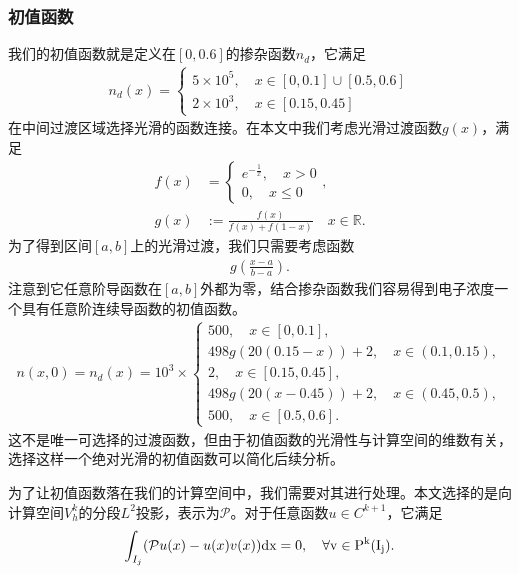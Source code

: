 \subsubsection{初值函数}
我们的初值函数就是定义在$[0, 0.6]$的掺杂函数$n_d$，它满足
\begin{align*}
    n_d(x) = \begin{cases}
                 5\times 10^{5}, \quad x \in [0, 0.1] \cup [0.5, 0.6] \\
                 2\times 10^{3}, \quad x \in [0.15,0.45]
             \end{cases}
\end{align*}
在中间过渡区域选择光滑的函数连接。在本文中我们考虑光滑过渡函数$g(x)$，满足
\begin{align*}
    f(x)               & ={\begin{cases}
                               e^{-{\frac {1}{x}}}, \quad x>0 \\
                               0, \quad x\leq 0\end{cases}} ,                     \\
    \displaystyle g(x) & :={\frac {f(x)}{f(x)+f(1-x)}}\quad x\in \mathbb {R}.
\end{align*}
为了得到区间$[a,b]$上的光滑过渡，我们只需要考虑函数
\begin{align*}
    g(\frac{x-a}{b-a}).
\end{align*}
注意到它任意阶导函数在$[a,b]$外都为零，结合掺杂函数我们容易得到电子浓度一个具有任意阶连续导函数的初值函数。
\begin{align}
    n(x,0) = n_d(x) = 10^3 \times
    \begin{cases}
        500,\quad x\in [0,0.1],                        \\
        498g(20(0.15-x)) + 2,\quad x \in (0.1, 0.15),  \\
        2, \quad x\in [0.15, 0.45],                    \\
        498g(20(x-0.45)) + 2, \quad x \in (0.45, 0.5), \\
        500, \quad x\in [0.5, 0.6].
    \end{cases}
\end{align}
这不是唯一可选择的过渡函数，但由于初值函数的光滑性与计算空间的维数有关，选择这样一个绝对光滑的初值函数可以简化后续分析。

为了让初值函数落在我们的计算空间中，我们需要对其进行处理。本文选择的是向计算空间$V_h^k$的分段$L^2$投影，表示为$\mathcal{P}$。对于任意函数$u\in C^{k+1}$，它满足
\begin{align}
    \int_{I_j}(\mathcal{P}u(x)-u(x)v(x)) \rm{d}x = 0, \quad \forall v \in P^k(I_j).
\end{align}
